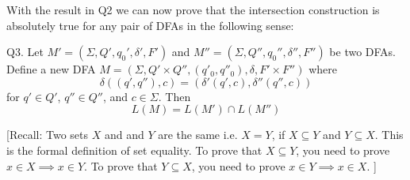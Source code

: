 \SOLUTION




\newpage
With the result in Q2 we can now prove that the intersection
construction 
is absolutely true for any pair of DFAs in the following sense:

Q3. 
Let $M' = (\Sigma, Q', q_0', \delta', F')$
and $M'' = (\Sigma, Q'', q_0'', \delta'', F'')$ be two DFAs.
Define a new DFA $M = (\Sigma, Q' \times Q'', (q'_0, q''_0), 
\delta, F' \times F'')$ where
\[
\delta((q',q''), c) = (\delta'(q', c), \delta''(q'',c))
\]
for $q' \in Q'$, $q'' \in Q''$, and $c \in \Sigma$.
Then
\[
L(M) = L(M') \cap L(M'')
\]

[Recall: Two sets $X$ and and $Y$ are the same i.e. $X = Y$,
if $X \subseteq Y$ and $Y \subseteq X$.
This is the formal definition of set equality.
To prove that $X \subseteq Y$, you need to prove
$x \in X \implies x \in Y$.
To prove that $Y \subseteq X$, you need to prove 
$x \in Y \implies x \in X$.
]


\SOLUTION




